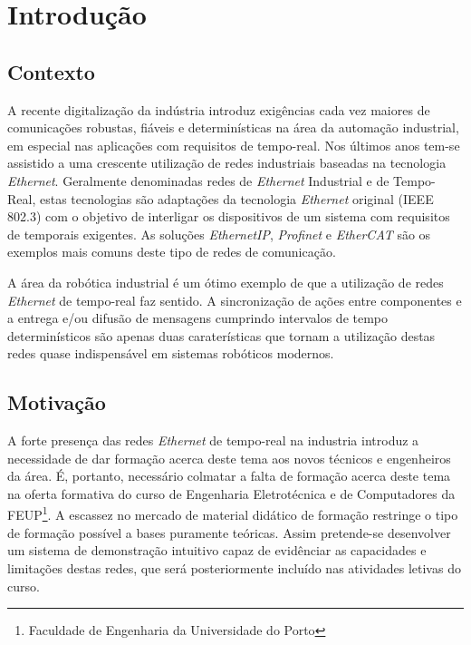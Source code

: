 \chapter{Introdução} \label{chap:intro}




\section{Contexto}\label{sec:contexto}

A recente digitalização da indústria introduz exigências cada vez maiores de comunicações robustas, fiáveis e determinísticas na área da automação industrial, em especial nas aplicações com requisitos de tempo-real.
Nos últimos anos tem-se assistido a uma crescente utilização de redes industriais baseadas na tecnologia \textit{Ethernet}. Geralmente denominadas redes de \textit{Ethernet} Industrial e de Tempo-Real, estas tecnologias são adaptações
da tecnologia \textit{Ethernet} original (IEEE 802.3) com o objetivo de interligar os dispositivos de um sistema com requisitos de temporais exigentes. As soluções \textit{EthernetIP}, \textit{Profinet} e \textit{EtherCAT} são os exemplos mais comuns
deste tipo de redes de comunicação.

A área da robótica industrial é um ótimo exemplo de que a utilização de redes \textit{Ethernet} de tempo-real faz sentido. A sincronização de ações entre componentes e a entrega e/ou difusão de mensagens cumprindo intervalos de tempo determinísticos são apenas duas
caraterísticas que tornam a utilização destas redes quase indispensável em sistemas robóticos modernos.


\section{Motivação}\label{sec:motivacao}

A forte presença das redes \textit{Ethernet} de tempo-real na industria introduz a necessidade de dar formação acerca deste tema aos novos técnicos e engenheiros da área.
É, portanto, necessário colmatar a falta de formação acerca deste tema na oferta formativa do curso de Engenharia Eletrotécnica e de Computadores da FEUP\footnote{Faculdade de Engenharia da Universidade do Porto}.
A escassez no mercado de material didático de formação restringe o tipo de formação possível a bases puramente teóricas.
Assim pretende-se desenvolver um sistema de demonstração intuitivo capaz de evidênciar as capacidades e limitações destas redes, que será posteriormente incluído nas atividades letivas do curso.

